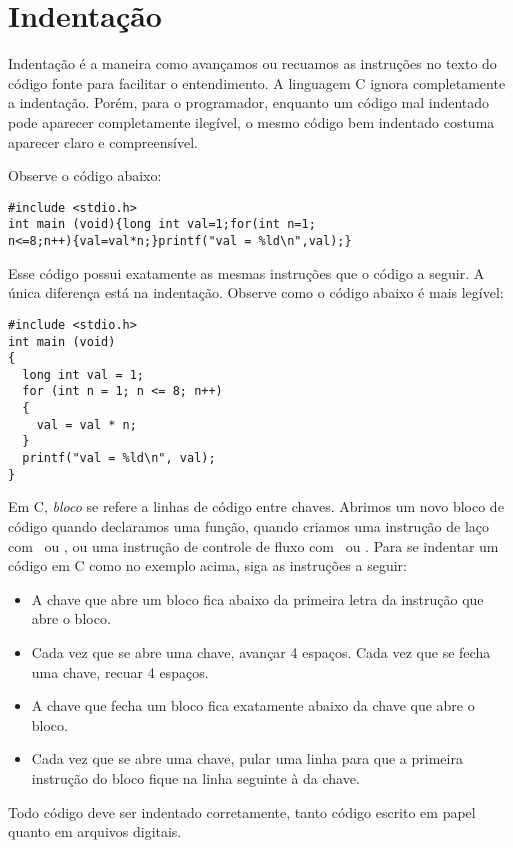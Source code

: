 
\chapter{Indentação}

Indentação é a maneira como avançamos ou recuamos as instruções no texto do código fonte para facilitar o entendimento. A linguagem C ignora completamente a indentação. Porém, para o programador, enquanto um código mal indentado pode aparecer completamente ilegível, o mesmo código bem indentado costuma aparecer claro e compreensível.

Observe o código abaixo: 

\begin{lstlisting}
#include <stdio.h> 
int main (void){long int val=1;for(int n=1; 
n<=8;n++){val=val*n;}printf("val = %ld\n",val);}
\end{lstlisting}

Esse código possui exatamente as mesmas instruções que o código a seguir. A única diferença está na indentação. Observe como o código abaixo é mais legível:

\begin{lstlisting}
#include <stdio.h>
int main (void)
{
  long int val = 1;
  for (int n = 1; n <= 8; n++)
  {
    val = val * n; 
  }
  printf("val = %ld\n", val);
}
\end{lstlisting}

\pagebreak

Em C, {\it bloco} se refere a linhas de código entre chaves. Abrimos um novo bloco de código quando declaramos uma função, quando criamos uma instrução de laço com \FOR\ ou \WHILE, ou uma instrução de controle de fluxo com \IF\ ou \SWITCH.
Para se indentar um código em C como no exemplo acima, siga as instruções a seguir:

\begin{itemize}
\item A chave que abre um bloco fica abaixo da primeira letra da instrução que abre o bloco.
\item Cada vez que se abre uma chave, avançar 4 espaços. Cada vez que se fecha uma chave, recuar 4 espaços.
\item A chave que fecha um bloco fica exatamente abaixo da chave que abre o bloco.
\item Cada vez que se abre uma chave, pular uma linha para que a primeira instrução do bloco fique na linha seguinte à da chave.
\end{itemize}

Todo código deve ser indentado corretamente, tanto código escrito em papel quanto em arquivos digitais.
